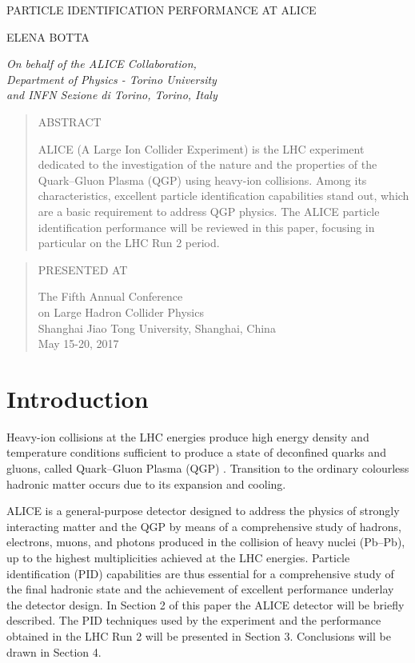 \documentclass[10pt]{article}
\def\Title#1{\begin{center} {\Large #1 } \end{center}}
\def\Author#1{\begin{center}{ \sc #1} \end{center}}
\def\Address#1{\begin{center}{ \it #1} \end{center}}
\newcommand\pubblock{\rightline{\begin{tabular}{l} Proceedings of the Fifth Annual LHCP\\ \pubnumber\\
         \pubdate  \end{tabular}}}
\newenvironment{Abstract}{\begin{quotation} \begin{center} 
             \large ABSTRACT \end{center}\bigskip 
      \begin{center}\begin{large}}{\end{large}\end{center} \end{quotation}}
\newenvironment{Presented}{\begin{quotation} \begin{center} 
             PRESENTED AT\end{center}\bigskip 
      \begin{center}\begin{large}}{\end{large}\end{center} \end{quotation}}
\newcommand\pubnumber{ }
\newcommand\pubdate{\today}
\def\affiliation{
On behalf of the ALICE Collaboration, \\
Department of Physics - Torino University \\
and INFN Sezione di Torino, Torino, Italy}
\begin{document}
\large
\begin{titlepage}
\pubblock


\vfill
\Title{  PARTICLE IDENTIFICATION PERFORMANCE AT ALICE  }
\vfill

\Author{ ELENA BOTTA  }
\Address{\affiliation}
\vfill
\begin{Abstract}
ALICE (A Large Ion Collider Experiment) is the LHC experiment dedicated to the investigation of the nature and the properties of the Quark--Gluon Plasma (QGP) using heavy-ion collisions. Among its characteristics, excellent particle identification capabilities stand out, which are a basic requirement to address QGP physics. The ALICE particle identification performance will be reviewed in this paper, focusing in particular on the LHC Run 2 period.
\end{Abstract}
\vfill

\begin{Presented}
The Fifth Annual Conference\\
 on Large Hadron Collider Physics \\
Shanghai Jiao Tong University, Shanghai, China\\ 
May 15-20, 2017
\end{Presented}
\vfill
\end{titlepage}
\def\thefootnote{\fnsymbol{footnote}}
\setcounter{footnote}{0}
%

\normalsize 


\section{Introduction}
Heavy-ion collisions at the LHC energies produce high energy density and temperature conditions sufficient to produce a state of deconfined quarks and gluons, called Quark--Gluon Plasma (QGP) \cite{ref:qgp}. Transition to the ordinary colourless hadronic matter occurs due to its expansion and cooling. 

ALICE is a general-purpose detector designed to address the physics of strongly interacting matter and the QGP by means of a comprehensive study of hadrons, electrons, muons, and photons produced in the collision of heavy nuclei (Pb--Pb), up to the highest multiplicities achieved at the LHC energies. Particle identification (PID) capabilities are thus essential for a comprehensive study of the final hadronic state and the achievement of excellent performance underlay the detector design. 
In Section 2 of this paper the ALICE detector will be briefly described. The PID techniques used by the experiment and the performance obtained in the LHC Run 2 will be presented in Section 3. Conclusions will be drawn in Section 4.
\end{document}
